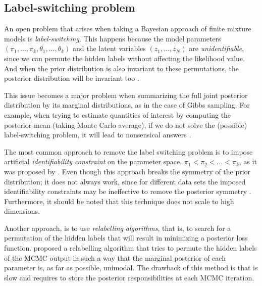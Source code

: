 \subsection{Label-switching problem} \label{fdmm-relable-subsect}
An open problem that arises when taking a Bayesian approach of finite mixture models is \emph{label-switching}. This happens because the model parameters $(\pi_{1},...,\pi_{k},\theta_{1},...,\theta_{k})$ and the latent variables $(z_{1},...,z_{N})$ are \emph{unidentifiable}, since we can permute the hidden labels without affecting the likelihood value. And when the prior distribution is also invariant to these permutations, the posterior distribution will be invariant too \citep{Rufo2006}.

This issue becomes a major problem when summarizing the full joint posterior distribution by its marginal distributions, as in the case of Gibbs sampling. For example, when trying to estimate quantities of interest by computing the posterior mean (\ie taking Monte Carlo average), if we do not solve the (possible) label-switching problem, it will lead to nonsensical answers \citep{Stephens2000}. 

The most common approach to remove the label switching problem is to impose artificial \emph{identifiability constraint} on the parameter space, \eg $\pi_{1} < \pi_{2} < ... < \pi_{k}$, as it was proposed by \citet{Richardson1997}. Even though this approach breaks the symmetry of the prior distribution; it does not always work, since for different data sets the imposed identifiability constraints may be ineffective to remove the posterior symmetry \citep{Celeux2000}. Furthermore, it should be noted that this technique does not scale to high dimensions. 

Another approach, is to use \emph{relabelling algorithms}, that is, to search for a permutation of the hidden labels that will result in minimizing a posterior loss function. \citet{Stephens2000} proposed a relabelling algorithm that tries to permute the hidden labels of the MCMC output in such a way that the marginal posterior of each parameter is, as far as possible, unimodal. The drawback of this method is that is slow and requires to store the posterior responsibilities at each MCMC iteration. 